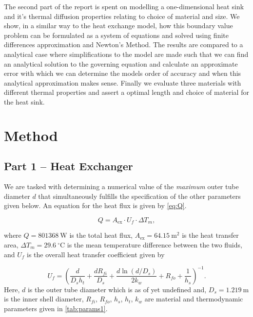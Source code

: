 \documentclass[11pt, a4paper]{article}
\theoremstyle{definition}
\begin{document}
The second part of the report is spent on modelling a one-dimensional heat sink and it's thermal diffusion properties relating to choice of material and size. We show, in a similar way to the heat exchange model, how this boundary value problem can be formulated as a system of equations and solved using finite differences approximation and Newton's Method. The results are compared to a analytical case where simplifications to the model are made such that we can find an analytical solution to the governing equation and calculate an approximate error with which we can determine the models order of accuracy and when this analytical approximation makes sense. Finally we evaluate three materials with different thermal properties and assert a optimal length and choice of material for the heat sink.
\section{Method}
\subsection{Part 1 -- Heat Exchanger}
We are tasked with determining a numerical value of the \textit{maximum} outer
tube diameter $d$ that simultaneously fulfills the specification of the other
parameters given below. An equation for the heat flux is given by \cref{eq:Q}.

\begin{equation}
  Q = A_{\mathrm{ex}} \cdot U_f \cdot \Delta T_m,
  \label{eq:Q}
\end{equation}

where $Q = 801368\ \mathrm{W}$ is the total heat flux,
$A_{\mathrm{ex}} = 64.15\ \mathrm{m}^2$ is the heat transfer area,
$\Delta T_m = 29.6\ ^\circ\mathrm{C}$ is the mean temperature difference
between the two fluids, and $U_f$ is the overall heat transfer coefficient
given by

\begin{equation}
  U_f = \left(
    \frac{d}{D_s h_t}
    + \frac{d R_{fi}}{D_s}
    + \frac{d \ln(d/D_s)}{2k_w}
    + R_{fo} + \frac{1}{h_s}
  \right)^{-1}.
  \label{eq:Uf}
\end{equation}
Here, $d$ is the outer tube diameter which is as of yet undefined and, $D_s = 1.219\ \mathrm{m}$
is the inner shell diameter, $R_{fi}$, $R_{fo}$, $h_s$, $h_t$, $k_w$ are
material and thermodynamic parameters given in \cref{tab:params1}.
\end{document}
